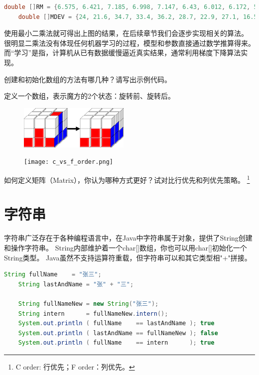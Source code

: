 \begin{example}
	\begin{lstlisting}[language=java]
	double []RM = {6.575, 6.421, 7.185, 6.998, 7.147, 6.43, 6.012, 6.172, 5.631};
	double []MDEV = {24, 21.6, 34.7, 33.4, 36.2, 28.7, 22.9, 27.1, 16.5};
	\end{lstlisting}

	使用最小二乘法就可得出上图的结果，在后续章节我们会逐步实现相关的算法。
	很明显二乘法没有体现任何机器学习的过程，模型和参数直接通过数学推算得来。
	而“学习”是指，计算机从已有数据缓慢逼近真实结果，通常利用梯度下降算法实现。
\end{example}
\bigskip

\begin{exercise}
	创建和初始化数组的方法有哪几种？请写出示例代码。
\end{exercise}

\begin{exercise}
	定义一个数组，表示魔方的2个状态：旋转前、旋转后。
\end{exercise}

\begin{figure}[!htb] \centering
	\begin{minipage}{0.4\textwidth}
		\centerline{\includegraphics[scale=.5]{part1/rubik.png}}
	\end{minipage}
	\begin{minipage}{0.4\textwidth}
		\centerline{\texttt{[image: c\_vs\_f\_order.png]}}
	\end{minipage}
\end{figure}

\begin{exercise}
	如何定义矩阵（Matrix），你认为哪种方式更好？试对比行优先和列优先策略。
	\footnote{C order: 行优先；F order：列优先。}
\end{exercise}

\section{字符串}
字符串广泛存在于各种编程语言中，在Java中字符串属于对象，提供了String创建和操作字符串。
String内部维护着一个char[]数组，你也可以用char[]初始化一个String类型。
Java虽然不支持运算符重载，但字符串可以和其它类型相"+"拼接。
\medskip

\begin{lstlisting}[language=Java]
	String fullName    = "张三";
	String lastAndName = "张" + "三";

	String fullNameNew = new String("张三");
	String intern      = fullNameNew.intern();
	System.out.println ( fullName    == lastAndName ); true
	System.out.println ( lastAndName == fullNameNew ); false
	System.out.println ( fullName    == intern      ); true
\end{lstlisting}

